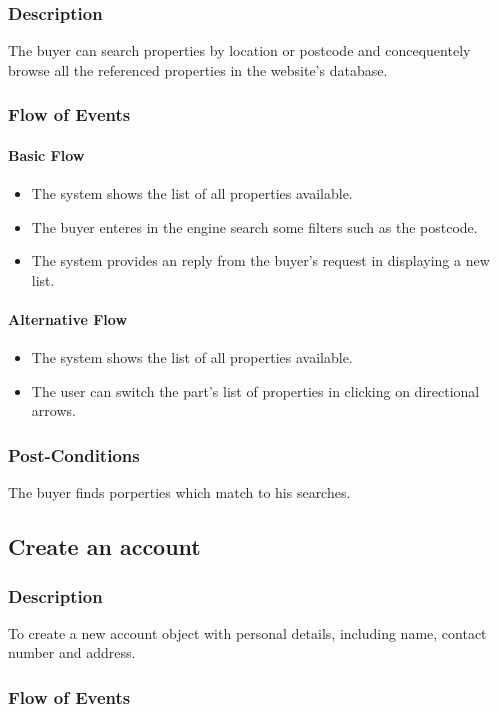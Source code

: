 \documentclass[a4paper,12pt]{article}
\begin{document}
\subsubsection{Description}
The buyer can search properties by location or postcode and concequentely browse all the referenced properties in the website's database.
\subsubsection{Flow of Events}
\paragraph{Basic Flow}
\begin{itemize}
\item The system shows the list of all properties available.
\item The buyer enteres in the engine search some filters such as the postcode.
\item The system provides an reply from the buyer's request in displaying a new list.
\end{itemize}
\paragraph{Alternative Flow}
\begin{itemize}
\item The system shows the list of all properties available.
\item The user can switch the part's list of properties in clicking on directional arrows.
\end{itemize}
\subsubsection{Post-Conditions}
The buyer finds porperties which match to his searches.

\subsection{Create an account}
\subsubsection{Description}
To create a new account object with personal details, including name, contact number and address.
\subsubsection{Flow of Events}
\end{document}
